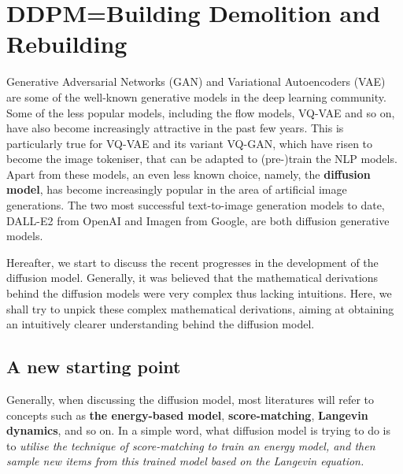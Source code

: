 \section{DDPM=Building Demolition and Rebuilding}
\label{section:DDPM_1}

Generative Adversarial Networks (GAN) and Variational Autoencoders (VAE) are some of the well-known generative models in the deep learning community. Some of the less popular models, including the flow models\cite{lipman2022flow}, VQ-VAE\cite{razavi2019generating} and so on, have also become increasingly attractive in the past few years. This is particularly true for VQ-VAE and its variant VQ-GAN, which have risen to become the image tokeniser, that can be adapted to (pre-)train the NLP models. Apart from these models, an even less known choice, namely, the \textbf{diffusion model}, has become increasingly popular in the area of artificial image generations. The two most successful text-to-image generation models to date,  DALL-E2 from OpenAI and Imagen from Google, are both diffusion generative models.

Hereafter, we start to discuss the recent progresses in the development of the diffusion model. Generally, it was believed that the mathematical derivations behind the diffusion models were very complex thus lacking intuitions. Here, we shall try to unpick these complex mathematical derivations, aiming at obtaining an intuitively clearer understanding behind the diffusion model.

\subsection{A new starting point}

Generally, when discussing the diffusion model, most literatures will refer to concepts such as \textbf{the energy-based model}, \textbf{score-matching}, \textbf{Langevin dynamics}, and so on. In a simple word, what diffusion model is trying to do is to \emph{utilise the technique of score-matching to train an energy model, and then sample new items from this trained model based on the Langevin equation.}

